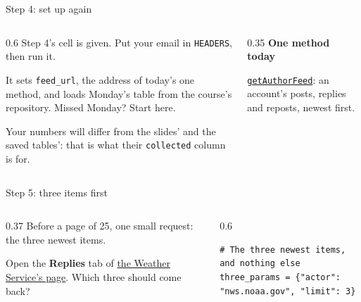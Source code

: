\documentclass[9pt,aspectratio=169]{beamer}
\begin{document}
\begin{frame}{Step 4: set up again}
    \begin{columns}[T]
        \begin{column}{0.6\textwidth}
            Step 4's cell is given. Put your email in \texttt{HEADERS}, then run it.

            \medskip
            It sets \texttt{feed\_url}, the address of today's one method, and loads Monday's table from the course's repository. Missed Monday? Start here.

            \medskip
            Your numbers will differ from the slides' and the saved tables': that is what their \texttt{collected} column is for.
        \end{column}
        \begin{column}{0.35\textwidth}
            \textbf{One method today}\\[2pt]
            {\footnotesize \href{https://endpoints.bsky.app/\#bluesky-app/tag/appbskyfeed/GET/xrpc/app.bsky.feed.getAuthorFeed}{\texttt{getAuthorFeed}}: an account's posts, replies and reposts, newest first.\par}
        \end{column}
    \end{columns}
\end{frame}

\begin{frame}[fragile]{Step 5: three items first}
    \begin{columns}[T]
        \begin{column}{0.37\textwidth}
            Before a page of 25, one small request: the three newest items.

            \medskip
            Open the \textbf{Replies} tab of \href{https://bsky.app/profile/nws.noaa.gov}{the Weather Service's page}. Which three should come back?
        \end{column}
        \begin{column}{0.6\textwidth}
\begin{lstlisting}
# The three newest items, and nothing else
three_params = {"actor": "nws.noaa.gov", "limit": 3}
\end{lstlisting}
        \end{column}
    \end{columns}
\end{frame}
\end{document}
